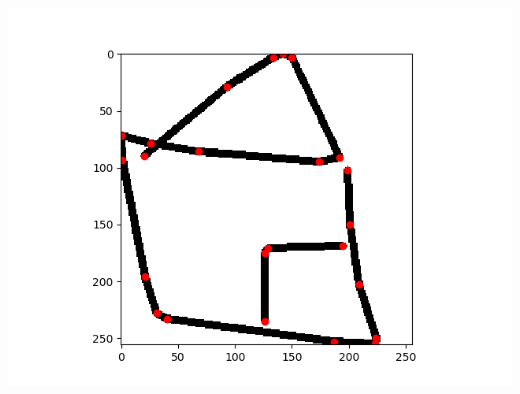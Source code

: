 \begin{center}
\includegraphics[width=15cm,height=15cm,keepaspectratio]{figures/housedraw.png}
\end{center}



